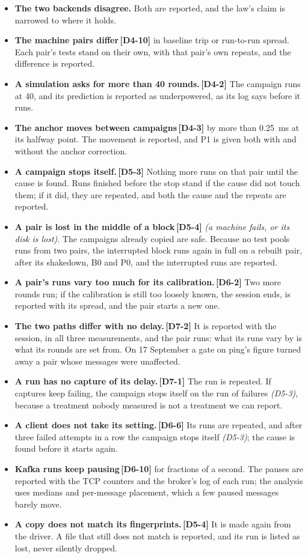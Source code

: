 \documentclass[11pt]{article}
\newcommand{\gl}[1]{{\color{soft}\itshape\small (#1)}}
\newcommand{\chgold}[1]{\,{\color{oldcol}\bfseries\footnotesize[#1]}}
\begin{document}
\begin{itemize}
  \item \textbf{The two backends disagree.} Both are reported, and the law's claim is narrowed to where it holds.
  \item \textbf{The machine pairs differ}\chgold{D4-10} in baseline trip or run-to-run spread. Each pair's tests stand on their own, with that pair's own repeats, and the difference is reported.
  \item \textbf{A simulation asks for more than 40 rounds.}\chgold{D4-2} The campaign runs at 40, and its prediction is reported as underpowered, as its log says before it runs.
  \item \textbf{The anchor moves between campaigns}\chgold{D4-3} by more than 0.25~ms at its halfway point. The movement is reported, and P1 is given both with and without the anchor correction.
  \item \textbf{A campaign stops itself.}\chgold{D5-3} Nothing more runs on that pair until the cause is found. Runs finished before the stop stand if the cause did not touch them; if it did, they are repeated, and both the cause and the repeats are reported.
  \item \textbf{A pair is lost in the middle of a block}\chgold{D5-4} \gl{a machine fails, or its disk is lost}. The campaigns already copied are safe. Because no test pools runs from two pairs, the interrupted block runs again in full on a rebuilt pair, after its shakedown, B0 and P0, and the interrupted runs are reported.
  \item \textbf{A pair's runs vary too much for its calibration.}\chgold{D6-2} Two more rounds run; if the calibration is still too loosely known, the session ends, is reported with its spread, and the pair starts a new one.
  \item \textbf{The two paths differ with no delay.}\chgold{D7-2} It is reported with the session, in all three measurements, and the pair runs: what its runs vary by is what its rounds are set from. On 17 September a gate on ping's figure turned away a pair whose messages were unaffected.
  \item \textbf{A run has no capture of its delay.}\chgold{D7-1} The run is repeated. If captures keep failing, the campaign stops itself on the run of failures \gl{D5-3}, because a treatment nobody measured is not a treatment we can report.
  \item \textbf{A client does not take its setting.}\chgold{D6-6} Its runs are repeated, and after three failed attempts in a row the campaign stops itself \gl{D5-3}; the cause is found before it starts again.
  \item \textbf{Kafka runs keep pausing}\chgold{D6-10} for fractions of a second. The pauses are reported with the TCP counters and the broker's log of each run; the analysis uses medians and per-message placement, which a few paused messages barely move.
  \item \textbf{A copy does not match its fingerprints.}\chgold{D5-4} It is made again from the driver. A file that still does not match is reported, and its run is listed as lost, never silently dropped.
\end{itemize}
\end{document}
